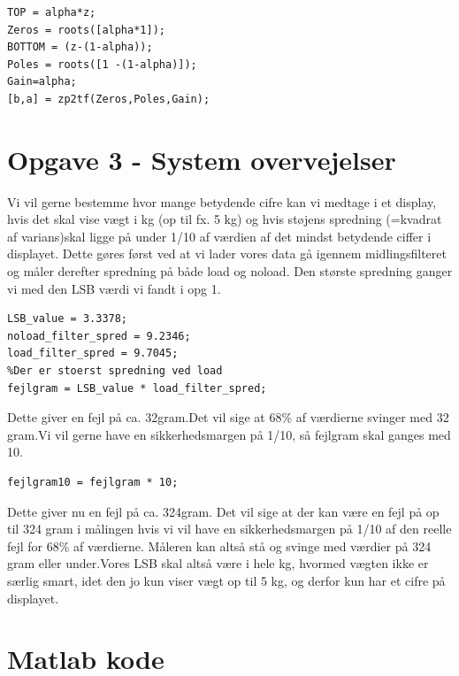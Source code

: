 \documentclass[12pt]{article}
\begin{document}
\begin{lstlisting}[frame=single] 
TOP = alpha*z;
Zeros = roots([alpha*1]);
BOTTOM = (z-(1-alpha));
Poles = roots([1 -(1-alpha)]);
Gain=alpha;
[b,a] = zp2tf(Zeros,Poles,Gain);
\end{lstlisting}

\section{Opgave 3 - System overvejelser}
Vi vil gerne bestemme hvor mange betydende cifre kan vi medtage i et display, hvis det skal vise vægt i kg (op til fx. 5 kg) og hvis støjens spredning (=kvadrat af varians)skal ligge på under 1/10 af værdien af det mindst betydende ciffer i displayet. Dette gøres først ved at vi lader vores data gå igennem midlingsfilteret og måler derefter
spredning på både load og noload. Den største spredning ganger vi med den LSB værdi vi fandt i opg 1.

\begin{lstlisting}[frame=single] 
LSB_value = 3.3378;
noload_filter_spred = 9.2346;
load_filter_spred = 9.7045;
%Der er stoerst spredning ved load
fejlgram = LSB_value * load_filter_spred;
\end{lstlisting}
Dette giver en fejl på ca. 32gram.Det vil sige at 68\% af værdierne svinger med 32 gram.Vi vil gerne have en sikkerhedsmargen på 1/10, så fejlgram skal ganges med 10.

\begin{lstlisting}[frame=single] 
fejlgram10 = fejlgram * 10;
\end{lstlisting}
Dette giver nu en fejl på ca. 324gram. Det vil sige at der kan være en fejl på op til 324 gram i målingen hvis vi vil have en sikkerhedsmargen på 1/10 af den reelle fejl for 68\% af værdierne. Måleren kan altså stå og svinge med værdier på 324 gram eller under.Vores LSB skal altså være i hele kg, hvormed vægten ikke er særlig smart, idet den jo kun viser vægt op til 5 kg, og derfor kun har et cifre på displayet.







\section{Matlab kode}
	
\end{document}
